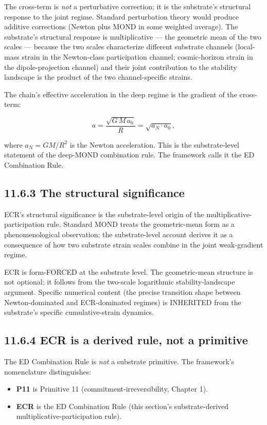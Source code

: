 \documentclass[11pt]{book}
\begin{document}
The cross-term is \textit{not} a perturbative correction; it is the substrate's structural response to the joint regime. Standard perturbation theory would produce additive corrections (Newton plus MOND in some weighted average). The substrate's structural response is multiplicative — the geometric mean of the two scales — because the two scales characterize different substrate channels (local-mass strain in the Newton-class participation channel; cosmic-horizon strain in the dipole-projection channel) and their joint contribution to the stability landscape is the product of the two channel-specific strains.

The chain's effective acceleration in the deep regime is the gradient of the cross-term:

\[
a = \frac{\sqrt{G\,M\,a_0}}{R} = \sqrt{a_N\cdot a_0},
\]

where $a_N = GM/R^2$ is the Newton acceleration. This is the substrate-level statement of the deep-MOND combination rule. The framework calls it the ED Combination Rule.

\subsection{11.6.3 The structural significance}

ECR's structural significance is the substrate-level origin of the multiplicative-participation rule. Standard MOND treats the geometric-mean form as a phenomenological observation; the substrate-level account derives it as a consequence of how two substrate strain scales combine in the joint weak-gradient regime.

ECR is form-FORCED at the substrate level. The geometric-mean structure is not optional; it follows from the two-scale logarithmic stability-landscape argument. Specific numerical content (the precise transition shape between Newton-dominated and ECR-dominated regimes) is INHERITED from the substrate's specific cumulative-strain dynamics.

\subsection{11.6.4 ECR is a derived rule, not a primitive}

The ED Combination Rule is \textit{not} a substrate primitive. The framework's nomenclature distinguishes:
\begin{itemize}
\item \textbf{P11} is Primitive 11 (commitment-irreversibility, Chapter 1).
\item \textbf{ECR} is the ED Combination Rule (this section's substrate-derived multiplicative-participation rule).
\end{itemize}
\end{document}
